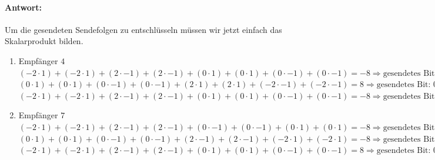 \paragraph{Antwort:} Um die gesendeten Sendefolgen zu entschlüsseln müssen wir jetzt einfach das Skalarprodukt bilden.
	\begin{enumerate}
		\item Empfänger $4$
			\\$(-2\cdot 1)+(-2\cdot 1)+(2\cdot -1)+(2\cdot -1)+(0\cdot 1)+(0\cdot 1)+(0\cdot -1)+(0\cdot -1) = -8 \Rightarrow \text{gesendetes Bit: } 1$
			\\$(0\cdot 1)+(0\cdot 1)+(0\cdot -1)+(0\cdot -1)+(2\cdot 1)+(2\cdot 1)+(-2\cdot -1)+(-2\cdot -1) = 8 \Rightarrow \text{gesendetes Bit: } 0$
			\\$(-2\cdot 1)+(-2\cdot 1)+(2\cdot -1)+(2\cdot -1)+(0\cdot 1)+(0\cdot 1)+(0\cdot -1)+(0\cdot -1) = -8 \Rightarrow \text{gesendetes Bit: } 1$
		\item Empfänger $7$	
			\\$(-2\cdot 1)+(-2\cdot 1)+(2\cdot -1)+(2\cdot -1)+(0\cdot -1)+(0\cdot -1)+(0\cdot 1)+(0\cdot 1) = -8 \Rightarrow \text{gesendetes Bit: } 1$
			\\$(0\cdot 1)+(0\cdot 1)+(0\cdot -1)+(0\cdot -1)+(2\cdot -1)+(2\cdot -1)+(-2\cdot 1)+(-2\cdot 1) = -8 \Rightarrow \text{gesendetes Bit: } 1$
			\\$(-2\cdot 1)+(-2\cdot 1)+(2\cdot -1)+(2\cdot -1)+(0\cdot 1)+(0\cdot 1)+(0\cdot -1)+(0\cdot -1) = 8 \Rightarrow \text{gesendetes Bit: } 0$
	\end{enumerate}